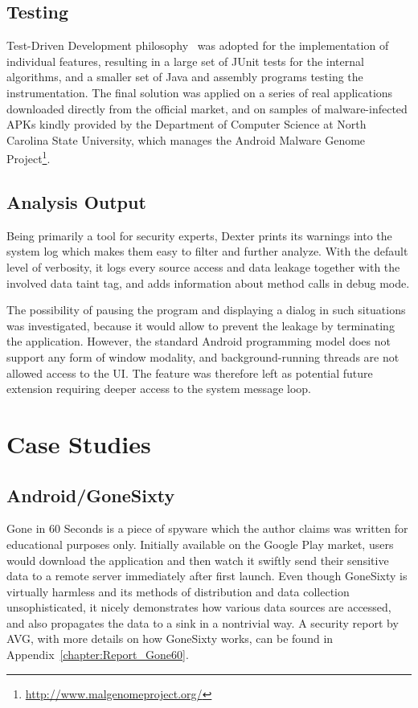 \documentclass[12pt,twoside,notitlepage]{report}
\newcommand{\weblink}[1] {\footnote{\scriptsize\url{#1}}}
\begin{document}
\subsection{Testing}

Test-Driven Development philosophy~\cite{Beck:2002:TDD:579193} was adopted for the implementation of individual features, resulting in a large set of JUnit tests for the internal algorithms, and a smaller set of Java and assembly programs testing the instrumentation. The final solution was applied on a series of real applications downloaded directly from the official market, and on samples of malware-infected APKs kindly provided by the Department of Computer Science at North Carolina State University, which manages the Android Malware Genome Project\weblink{http://www.malgenomeproject.org/}.

\subsection{Analysis Output}

Being primarily a tool for security experts, Dexter prints its warnings into the system log which makes them easy to filter and further analyze. With the default level of verbosity, it logs every source access and data leakage together with the involved data taint tag, and adds information about method calls in debug mode.

The possibility of pausing the program and displaying a dialog in such situations was investigated, because it would allow to prevent the leakage by terminating the application. However, the standard Android programming model does not support any form of window modality, and background-running threads are not allowed access to the UI. The feature was therefore left as potential future extension requiring deeper access to the system message loop.

\section{Case Studies}

\subsection{Android/GoneSixty}

Gone in 60 Seconds is a piece of spyware which the author claims was written for educational purposes only. Initially available on the Google Play market, users would download the application and then watch it swiftly send their sensitive data to a remote server immediately after first launch. Even though GoneSixty is virtually harmless and its methods of distribution and data collection unsophisticated, it nicely demonstrates how various data sources are accessed, and also propagates the data to a sink in a nontrivial way. A security report by AVG, with more details on how GoneSixty works, can be found in Appendix~\ref{chapter:Report_Gone60}.
\end{document}
